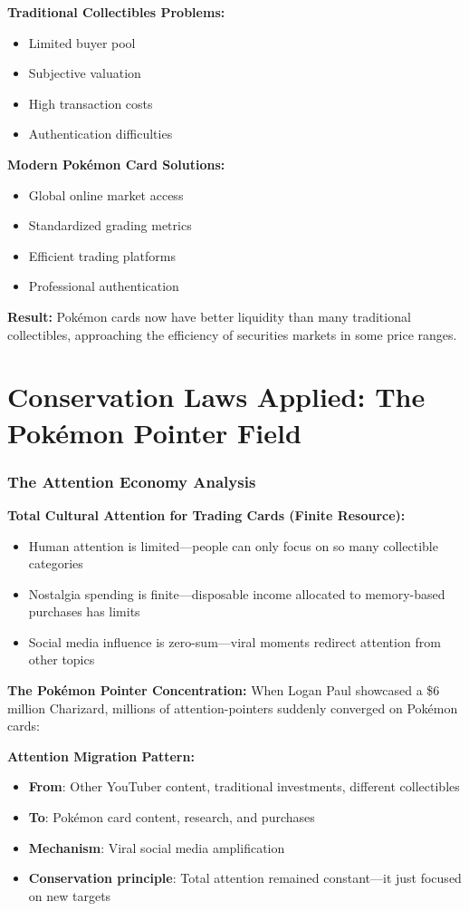 \documentclass[11pt,oneside]{book}
\begin{document}
{{{{{{\textbf{Traditional Collectibles Problems:}
\begin{itemize}
\item Limited buyer pool
\item Subjective valuation
\item High transaction costs
\item Authentication difficulties
\end{itemize}

\textbf{Modern Pokémon Card Solutions:}
\begin{itemize}
\item Global online market access
\item Standardized grading metrics
\item Efficient trading platforms
\item Professional authentication
\end{itemize}

\textbf{Result:} Pokémon cards now have better liquidity than many traditional collectibles, approaching the efficiency of securities markets in some price ranges.

\section{Conservation Laws Applied: The Pokémon Pointer Field}

\subsubsection{The Attention Economy Analysis}

\textbf{Total Cultural Attention for Trading Cards (Finite Resource):}
\begin{itemize}
\item Human attention is limited—people can only focus on so many collectible categories
\item Nostalgia spending is finite—disposable income allocated to memory-based purchases has limits
\item Social media influence is zero-sum—viral moments redirect attention from other topics
\end{itemize}

\textbf{The Pokémon Pointer Concentration:}
When Logan Paul showcased a \$6 million Charizard, millions of attention-pointers suddenly converged on Pokémon cards:

\textbf{Attention Migration Pattern:}
\begin{itemize}
\item \textbf{From}: Other YouTuber content, traditional investments, different collectibles
\item \textbf{To}: Pokémon card content, research, and purchases
\item \textbf{Mechanism}: Viral social media amplification
\item \textbf{Conservation principle}: Total attention remained constant—it just focused on new targets
\end{itemize}

}}}}}}
\end{document}

